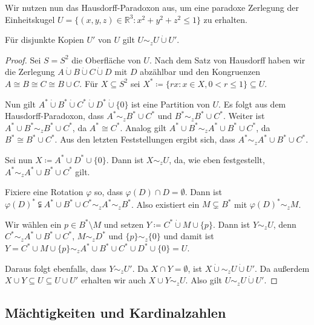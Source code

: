 Wir nutzen nun das Hausdorff-Paradoxon aus, um eine paradoxe Zerlegung der Einheitskugel $U=\{(x,y,z)\in\mathbb{R}^3 : x^2+y^2+z^2\leq 1\}$ zu erhalten.

\begin{satz}
	Für disjunkte Kopien $U'$ von $U$ gilt $U\sim_z U\dot{\cup} U'$.
\end{satz}
\begin{proof}
	Sei $S=S^2$ die Oberfläche von $U$. Nach dem Satz von Hausdorff haben wir die Zerlegung $A\dot{\cup}B\dot{\cup}C\dot{\cup}D$ mit $D$ abzählbar und den Kongruenzen $A\cong B\cong C\cong B\cup C$. Für $X\subseteq S^2$ sei $X^\ast\coloneqq\{rx:x\in X, 0<r\leq 1\}\subseteq U$.
	
	Nun gilt $A^\ast \dot{\cup} B^\ast \dot{\cup} C^\ast \dot{\cup} D^\ast \dot{\cup} \{0\}$ ist eine Partition von $U$. Es folgt aus dem Hausdorff-Paradoxon, dass $A^\ast\sim_z B^\ast\cup C^\ast$ und $B^\ast\sim_z B^\ast\cup C^\ast$. Weiter ist $A^\ast\cup B^\ast\sim_z B^\ast \cup C^\ast$, da $A^\ast\cong C^\ast$. Analog gilt $A^\ast\cup B^\ast \sim_z A^\ast \cup B^\ast \cup C^\ast$, da $B^\ast\cong B^\ast\cup C^\ast$. Aus den letzten Feststellungen ergibt sich, dass $A^\ast\sim_z A^\ast\cup B^\ast \cup C^\ast$.
	
	Sei nun $X\coloneqq A^\ast \cup D^\ast \cup \{0\}$. Dann ist $X\sim_z U$, da, wie eben festgestellt, $A^\ast \sim_z A^\ast \cup B^\ast \cup C^\ast$ gilt.
	
	Fixiere eine Rotation $\varphi$ so, dass $\varphi(D)\cap D =\emptyset$. Dann ist $\varphi(D)^\ast\subsetneqq A^\ast\cup B^\ast\cup C^\ast \sim_z A^\ast \sim_z B^\ast$. Also existiert ein $M\subsetneq B^\ast$ mit $\varphi(D)^\ast\sim_z M$.
	
	Wir wählen ein $p\in B^\ast\setminus M$ und setzen $Y\coloneqq C^\ast \dot{\cup} M \cup \{p\}$. Dann ist $Y\sim_z U$, denn $C^\ast \sim_z A^\ast \cup B^\ast \cup C^\ast$, $M\sim_z D^\ast$ und $\{p\}\sim_z\{0\}$ und damit ist $Y=C^\ast\cup M\cup\{p\}\sim_zA^\ast\cup B^\ast \cup C^\ast \cup D^\ast \cup \{0\}=U$.
	
	Daraus folgt ebenfalls, dass $Y\sim_z U'$. Da $X\cap Y=\emptyset$, ist $X\dot{\cup}\sim_z U\dot{\cup} U'$. Da außerdem $X\cup Y\subseteq U \subseteq U\cup U'$ erhalten wir auch $X\cup Y \sim_z U$. Also gilt $U\sim_z U\dot{\cup} U'$.
\end{proof}

\subsection{Mächtigkeiten und Kardinalzahlen}

